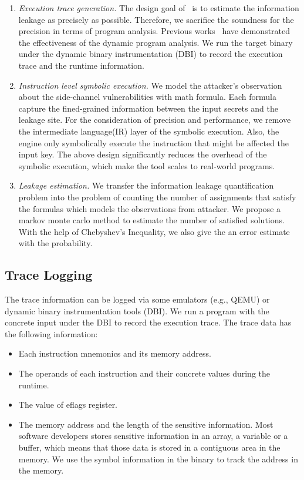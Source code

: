 \begin{enumerate}
    \item \textit{Execution trace generation.} The design goal of \tool\ is to
    estimate the information leakage as precisely as possible. Therefore,
    we sacrifice the soundness for the precision in terms of program analysis.
    Previous works~\cite{203878,217537} have demonstrated the effectiveness of the
    dynamic program analysis. We run the target binary under the dynamic binary
    instrumentation (DBI) to record the execution trace and the runtime information.
    \item \textit{Instruction level symbolic execution.} We model the 
    attacker's observation about the side-channel vulnerabilities with math
    formula. Each formula capture the fined-grained information between the input secrets
    and the leakage site. For the consideration of precision and performance, 
    we remove the intermediate language(IR) layer of the symbolic execution. 
    Also, the engine only symbolically execute the instruction that might be affected the
    input key. The above design significantly reduces the overhead of the symbolic
    execution, which make the tool scales to real-world programs.
    \item \textit{Leakage estimation.} We transfer the information leakage quantification
    problem into the problem of counting the number of assignments that satisfy the formulas
    which models the observations from attacker. We propose a markov monte carlo method to 
    estimate the number of satisfied solutions. With the help of Chebyshev's Inequality,
    we also give the an error estimate with the probability.
\end{enumerate}


\subsection{Trace Logging}
The trace information can be logged via some emulators (e.g., QEMU) or 
dynamic binary instrumentation tools (DBI). 
We run a program with the concrete input under the DBI to record the
execution trace.
The trace data has the following information:
\begin{itemize}
    \item Each instruction mnemonics and its memory address.
    \item The operands of each instruction and their concrete values during the 
          runtime.
    \item The value of eflags register. 
    \item The memory address and the length of the sensitive information.
     Most software developers stores sensitive information in an array,
     a variable or a buffer, which means that those data is stored in a contiguous 
     area in the memory. We use the symbol information in the binary to track the 
     address in the memory.
\end{itemize}


